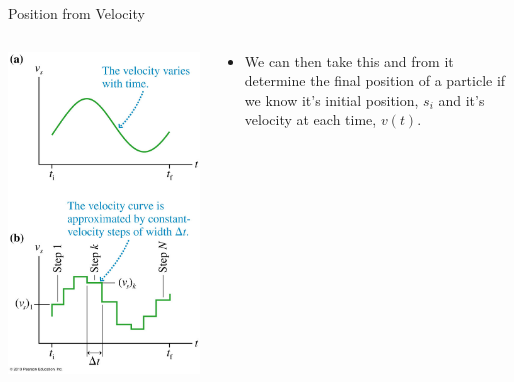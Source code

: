 \documentclass{beamer}
\begin{document}
\begin{frame}{Position from Velocity}
\begin{columns}
\begin{column}{0.3\textwidth}
   \includegraphics[width=\textwidth]{../figures/02_15_Figure.jpg}
\end{column}
\begin{column}{0.7\textwidth}
   \begin{itemize}
      \item We can then take this and from it determine the final position of a particle if we know it's initial position, $s_i$ and it's velocity at each time, $v(t)$.

\end{itemize}
\end{column}
\end{columns}
\end{frame}
\end{document}
